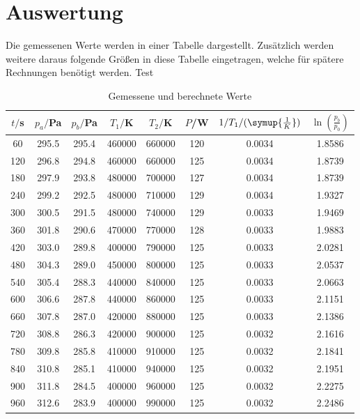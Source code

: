 \section{Auswertung}
\label{sec:Auswertung}
Die gemessenen Werte werden in einer Tabelle dargestellt. Zusätzlich werden weitere
daraus folgende Größen in diese Tabelle eingetragen, welche für spätere Rechnungen
benötigt werden. Test
\begin{table}[H]
  \centering
  \caption{Gemessene und berechnete Werte}
  \label{tab:Werte}
  \begin{tabular}{c c c c c c c c}
    \toprule
    $t/$s & $p_a/$Pa & $p_b/$Pa & $T_1/$K & $T_2/$K & $P$/W & $1/T_1/(\symup{\frac{1}{K}})$ & $\ln(\frac{p_b}{p_0})$ \\
    \midrule
      60  &  295.5 &  295.4 & 460000  &  660000 & 120 & 0.0034 & 1.8586 \\
     120  &  296.8 &  294.8 & 460000  &  660000 & 125 & 0.0034 & 1.8739 \\
     180  &  297.9 &  293.8 & 480000  &  700000 & 127 & 0.0034 & 1.8739 \\
     240  &  299.2 &  292.5 & 480000  &  710000 & 129 & 0.0034 & 1.9327 \\
     300  &  300.5 &  291.5 & 480000  &  740000 & 129 & 0.0033 & 1.9469 \\
     360  &  301.8 &  290.6 & 470000  &  770000 & 128 & 0.0033 & 1.9883 \\
     420  &  303.0 &  289.8 & 400000  &  790000 & 125 & 0.0033 & 2.0281 \\
     480  &  304.3 &  289.0 & 450000  &  800000 & 125 & 0.0033 & 2.0537 \\
     540  &  305.4 &  288.3 & 440000  &  840000 & 125 & 0.0033 & 2.0663 \\
     600  &  306.6 &  287.8 & 440000  &  860000 & 125 & 0.0033 & 2.1151 \\
     660  &  307.8 &  287.0 & 420000  &  880000 & 125 & 0.0033 & 2.1386 \\
     720  &  308.8 &  286.3 & 420000  &  900000 & 125 & 0.0032 & 2.1616 \\
     780  &  309.8 &  285.8 & 410000  &  910000 & 125 & 0.0032 & 2.1841 \\
     840  &  310.8 &  285.1 & 410000  &  940000 & 125 & 0.0032 & 2.1951 \\
     900  &  311.8 &  284.5 & 400000  &  960000 & 125 & 0.0032 & 2.2275 \\
     960  &  312.6 &  283.9 & 400000  &  990000 & 125 & 0.0032 & 2.2486 \\

\end{tabular}
\end{table}
